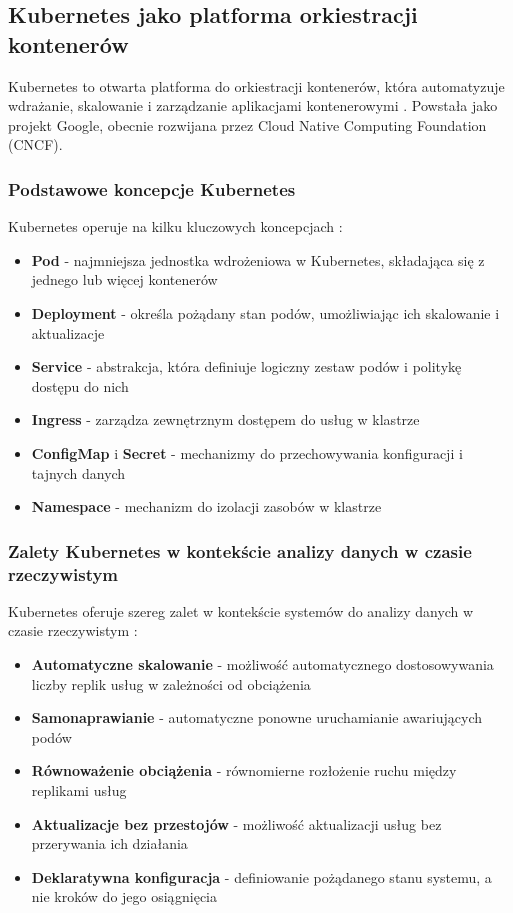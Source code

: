 \subsection{Kubernetes jako platforma orkiestracji kontenerów}
\label{subsec:kubernetes}

Kubernetes to otwarta platforma do orkiestracji kontenerów, która automatyzuje wdrażanie, skalowanie i zarządzanie aplikacjami kontenerowymi \citep{kubernetes}. Powstała jako projekt Google, obecnie rozwijana przez Cloud Native Computing Foundation (CNCF).

\subsubsection{Podstawowe koncepcje Kubernetes}
\label{subsubsec:podstawy_kubernetes}

Kubernetes operuje na kilku kluczowych koncepcjach \citep{kubernetes_concepts}:

\begin{itemize}
    \item \textbf{Pod} - najmniejsza jednostka wdrożeniowa w Kubernetes, składająca się z jednego lub więcej kontenerów
    \item \textbf{Deployment} - określa pożądany stan podów, umożliwiając ich skalowanie i aktualizacje
    \item \textbf{Service} - abstrakcja, która definiuje logiczny zestaw podów i politykę dostępu do nich
    \item \textbf{Ingress} - zarządza zewnętrznym dostępem do usług w klastrze
    \item \textbf{ConfigMap} i \textbf{Secret} - mechanizmy do przechowywania konfiguracji i tajnych danych
    \item \textbf{Namespace} - mechanizm do izolacji zasobów w klastrze
\end{itemize}

\subsubsection{Zalety Kubernetes w kontekście analizy danych w czasie rzeczywistym}
\label{subsubsec:zalety_kubernetes}

Kubernetes oferuje szereg zalet w kontekście systemów do analizy danych w czasie rzeczywistym \citep{kubernetes_benefits}:

\begin{itemize}
    \item \textbf{Automatyczne skalowanie} - możliwość automatycznego dostosowywania liczby replik usług w zależności od obciążenia
    \item \textbf{Samonaprawianie} - automatyczne ponowne uruchamianie awariujących podów
    \item \textbf{Równoważenie obciążenia} - równomierne rozłożenie ruchu między replikami usług
    \item \textbf{Aktualizacje bez przestojów} - możliwość aktualizacji usług bez przerywania ich działania
    \item \textbf{Deklaratywna konfiguracja} - definiowanie pożądanego stanu systemu, a nie kroków do jego osiągnięcia
\end{itemize}

